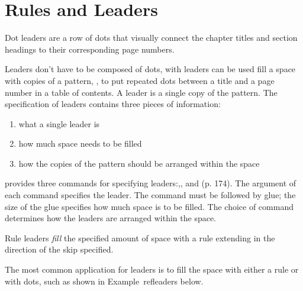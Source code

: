\chapter{Rules and Leaders}

Dot leaders are a row of dots that visually connect the chapter titles and section headings to their corresponding page numbers. 

Leaders don't have to be composed of dots, with \tex leaders can be used fill a space with copies of a pattern,
\eg, to put repeated dots between a title and a page number in a table
of contents. A leader is a single copy of the pattern. The specification of
leaders contains three pieces of information:

\begin{enumerate}
\item  what a single leader is
\item  how much space needs to be filled
\item  how the copies of the pattern should be arranged within the space
\end{enumerate}

\begin{macro}{\leaders}
\begin{macro}{\cleaders}
\begin{macro}{\xleaders}
\tex  provides three commands for specifying leaders:,,
and (p. 174). The argument of each command specifies the
leader. The command must be followed by glue; the size of the glue specifies
how much space is to be filled. The choice of command determines how
the leaders are arranged within the space.
\end{macro}
\end{macro}
\end{macro}

Rule leaders \textit{fill} the specified amount of space with a rule extending in the direction of the skip
specified. 

The most common application for leaders is to fill the space with either a rule or with dots, such as shown in Example~ref{leaders} below.


